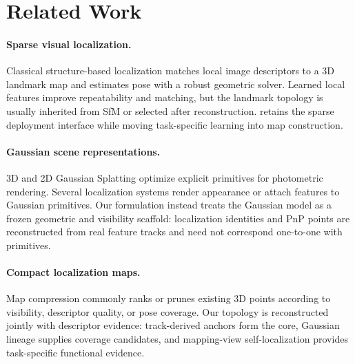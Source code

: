 \section{Related Work}

\paragraph{Sparse visual localization.}
Classical structure-based localization matches local image descriptors to a 3D
landmark map and estimates pose with a robust geometric solver. Learned local
features improve repeatability and matching, but the landmark topology is
usually inherited from SfM or selected after reconstruction. \method retains
the sparse deployment interface while moving task-specific learning into map
construction.

\paragraph{Gaussian scene representations.}
3D and 2D Gaussian Splatting optimize explicit primitives for photometric
rendering. Several localization systems render appearance or attach features
to Gaussian primitives. Our formulation instead treats the Gaussian model as a
frozen geometric and visibility scaffold: localization identities and PnP
points are reconstructed from real feature tracks and need not correspond
one-to-one with primitives.

\paragraph{Compact localization maps.}
Map compression commonly ranks or prunes existing 3D points according to
visibility, descriptor quality, or pose coverage. Our topology is reconstructed
jointly with descriptor evidence: track-derived anchors form the core, Gaussian
lineage supplies coverage candidates, and mapping-view self-localization
provides task-specific functional evidence.

